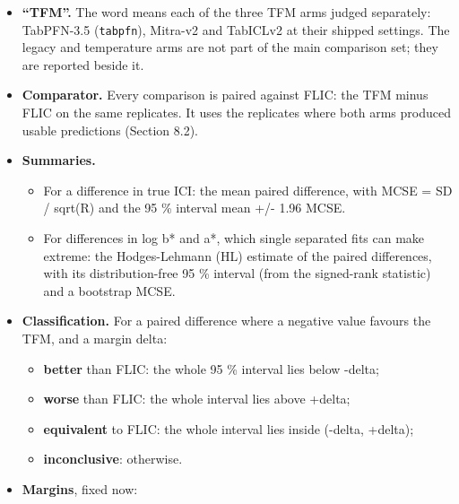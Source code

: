 \documentclass[
  10pt,
]{article}
\providecommand{\tightlist}{%
  \setlength{\itemsep}{0pt}\setlength{\parskip}{0pt}}
\begin{document}
\begin{itemize}
\tightlist
\item
  \textbf{``TFM''.} The word means each of the three TFM
  arms judged separately: TabPFN-3.5 (\texttt{tabpfn}),
  Mitra-v2 and TabICLv2 at their shipped settings. The
  legacy and temperature arms are not part of the main
  comparison set; they are reported beside it.
\item
  \textbf{Comparator.} Every comparison is paired against
  FLIC: the TFM minus FLIC on the same replicates. It uses
  the replicates where both arms produced usable predictions
  (Section 8.2).
\item
  \textbf{Summaries.}

  \begin{itemize}
  \tightlist
  \item
    For a difference in true ICI: the mean paired
    difference, with MCSE = SD / sqrt(R) and the 95 \%
    interval mean +/- 1.96 MCSE.
  \item
    For differences in \textbar log b*\textbar{} and
    \textbar a*\textbar, which single separated fits can
    make extreme: the Hodges-Lehmann (HL) estimate of the
    paired differences, with its distribution-free 95 \%
    interval (from the signed-rank statistic) and a
    bootstrap MCSE.
  \end{itemize}
\item
  \textbf{Classification.} For a paired difference where a
  negative value favours the TFM, and a margin delta:

  \begin{itemize}
  \tightlist
  \item
    \textbf{better} than FLIC: the whole 95 \% interval lies
    below -delta;
  \item
    \textbf{worse} than FLIC: the whole interval lies above
    +delta;
  \item
    \textbf{equivalent} to FLIC: the whole interval lies
    inside (-delta, +delta);
  \item
    \textbf{inconclusive}: otherwise.
  \end{itemize}
\item
  \textbf{Margins}, fixed now:


\end{itemize}
\end{document}

